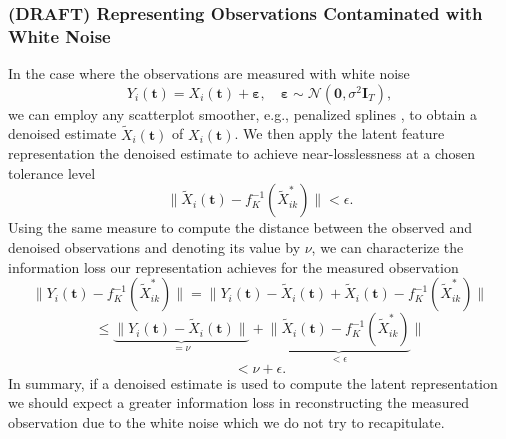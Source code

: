 \subsubsection{(DRAFT) Representing Observations Contaminated with White Noise}
In the case where the observations are measured with white noise
$$
Y_i(\mathbf{t}) = {X}_i(\mathbf{t}) + \boldsymbol{\varepsilon}, \quad \boldsymbol{\varepsilon} \sim \mathcal{N}(\mathbf{0}, \sigma^2 \mathbf{I}_{T}),
$$
we can employ any scatterplot smoother, e.g., penalized splines \parencite{osullivan_statistical_1986}, to obtain a denoised estimate $\widetilde{X}_i(\mathbf{t})$ of ${X}_i(\mathbf{t})$. 
We then apply the latent feature representation the denoised estimate to achieve near-losslessness at a chosen tolerance level
$$
\lVert \widetilde{X}_i(\mathbf{t}) - f^{-1}_{K}(\widetilde{X}_{ik}^*)\rVert < \epsilon.
$$
Using the same measure to compute the distance between the observed and denoised observations and denoting its value by $\nu$, we can characterize the information loss our representation achieves for the measured observation
$$
\lVert Y_i(\mathbf{t}) -  f^{-1}_{K}(\widetilde{X}_{ik}^*) \rVert = \lVert Y_i(\mathbf{t}) - \widetilde{X}_i(\mathbf{t}) + \widetilde{X}_i(\mathbf{t}) -  f^{-1}_{K}(\widetilde{X}_{ik}^*) \rVert
$$
$$
\leq
\underbrace{\lVert Y_i(\mathbf{t}) - \widetilde{X}_i(\mathbf{t}) \rVert}_{= \nu} + \underbrace{\lVert \widetilde{X}_i(\mathbf{t}) -  f^{-1}_{K}(\widetilde{X}_{ik}^*)}_{< \epsilon} \rVert
$$
$$
< \nu + \epsilon.
$$
In summary, if a denoised estimate is used to compute the latent representation we should expect a greater information loss in reconstructing the measured observation due to the white noise which we do not try to recapitulate.
